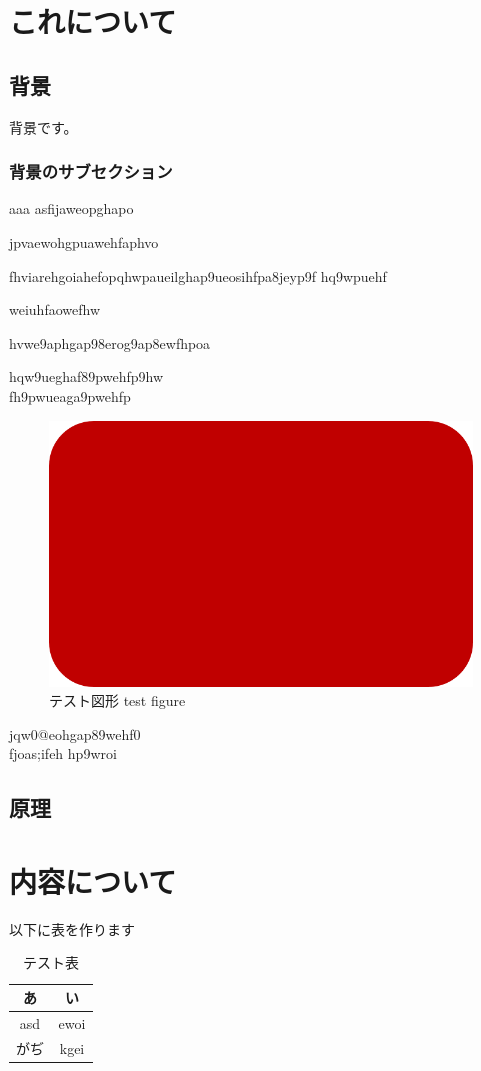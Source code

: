 \documentclass[11pt]{jsarticle}
\newcommand{\newsection}[1]{\clearpage \vspace*{24zw} \section{#1} \clearpage}
\begin{document}
\tableofcontents
\clearpage

\newsection{これについて}

\subsection{背景}
背景です。
\subsubsection{背景のサブセクション}
aaa
asfijaweopghapo



jpvaewohgpuawehfaphvo

fhviarehgoiahefopqhwpaueilghap9ueosihfpa8jeyp9f
hq9wpuehf

weiuhfaowefhw

hvwe9aphgap98erog9ap8ewfhpoa

hqw9ueghaf89pwehfp9hw\\
fh9pwueaga9pwehfp

\begin{figure}[H]
	\centering
	\includegraphics[width=0.6\linewidth]{test.png}
	\caption{テスト図形 test figure}
	\label{fig:test}
\end{figure}%


jqw0@eohgap89wehf0\\
fjoas;ifeh
hp9wroi
\subsection{原理}
\newsection{内容について}
以下に表を作ります
\begin{table}
	\centering
	\caption{テスト表}
	\label{tab:test}
	\begin{tabular}{|c|c|} \hline
		あ & い　\\ \hline
		asd & ewoi \\ \hline
		がぢ & kgei \\ \hline
	\end{tabular}
\end{table}
	
\end{document}
